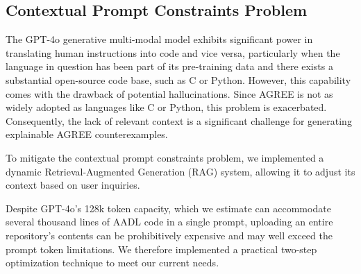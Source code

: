 
\subsection{Contextual Prompt Constraints Problem}

The GPT-4o generative multi-modal model exhibits significant power in translating human instructions into code and vice versa, particularly when the language in question has been part of its pre-training data and there exists a substantial open-source code base, such as C or Python. However, this capability comes with the drawback of potential hallucinations. Since AGREE is not as widely adopted as languages like C or Python, this problem is exacerbated. 
Consequently, the lack of relevant context is a significant challenge for generating explainable AGREE counterexamples. 

To mitigate the contextual prompt constraints problem, we implemented a dynamic Retrieval-Augmented Generation (RAG) system, allowing it to adjust its context based on user inquiries.

Despite GPT-4o's 128k token capacity, which we estimate can accommodate several thousand lines of AADL code in a single prompt, uploading an entire repository's contents can be prohibitively expensive and may well exceed the prompt token limitations. We therefore implemented a practical two-step optimization technique to meet our current needs.

